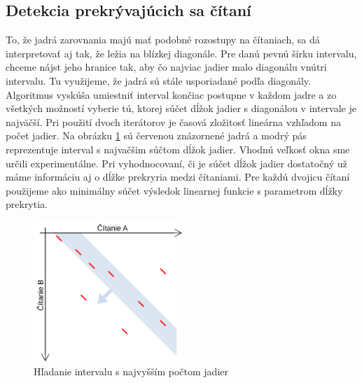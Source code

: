 \subsection{Detekcia prekrývajúcich sa čítaní}

To, že jadrá zarovnania majú mať podobné rozostupy na čítaniach, sa dá interpretovať aj tak, že ležia na blízkej diagonále. Pre danú pevnú šírku intervalu, chceme nájst jeho hranice tak, aby čo najviac jadier malo diagonálu vnútri intervalu. Tu využijeme, že jadrá sú stále usporiadané podľa diagonály. Algoritmus vyskúša umiestniť interval končiac postupne v každom jadre a zo všetkých možností vyberie tú, ktorej súčet dĺžok jadier s diagonálou v intervale je najväčší. Pri použití dvoch iterátorov je časová zložitosť lineárna vzhľadom na počet jadier. Na obrázku \ref{fig:diagonalovy_interval} sú červenou znázornené jadrá a modrý pás reprezentuje interval s najvačšim súčtom dĺžok jadier. Vhodnú veľkosť okna sme určili experimentálne. Pri vyhodnocovaní, či je súčet dĺžok jadier dostatočný už máme informáciu aj o dĺžke prekryria medzi čítaniami. Pre každú dvojicu čítaní použijeme ako minimálny súčet výsledok linearnej funkcie s parametrom dĺžky prekrytia.

\begin{figure}
    \centering
    \includegraphics[width=0.5\textwidth]{images/diagonalovy_interval.png}
    \caption{Hľadanie intervalu s najvyšším počtom jadier}
    \label{fig:diagonalovy_interval}
\end{figure} 